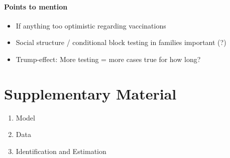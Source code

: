 



\paragraph{Points to mention}
\begin{itemize}
    \item If anything too optimistic regarding vaccinations
    \item Social structure / conditional block testing in families important (?)
    \item Trump-effect: More testing = more cases true for how long?
\end{itemize}







\section{Supplementary Material}

\begin{enumerate}
    \item Model
    \item Data
    \item Identification and Estimation
\end{enumerate}